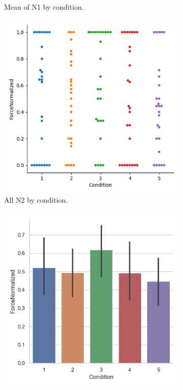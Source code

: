 \begin{figure}[H]
\begin{subfigure}[b]{0.4\textwidth}
         \caption{Mean of N1  by condition. }
         \label{fig:meanN1Cond}
     \end{subfigure} 
     \hspace*{\fill}
         \begin{subfigure}[b]{0.4\textwidth}
         \centering
         \includegraphics[width=\textwidth]{Files/Plots/forceNormalized_by_cond_swarm.png}
         \caption{All N2 by condition.}
         \label{fig:allN2Norm}
     \end{subfigure}
\hspace*{\fill}
     \begin{subfigure}[b]{0.4\textwidth}
         \centering
         \includegraphics[width=\textwidth]{Files/Plots/forceNormalized_mean_by_condition.png}

\end{subfigure}
\end{figure}
